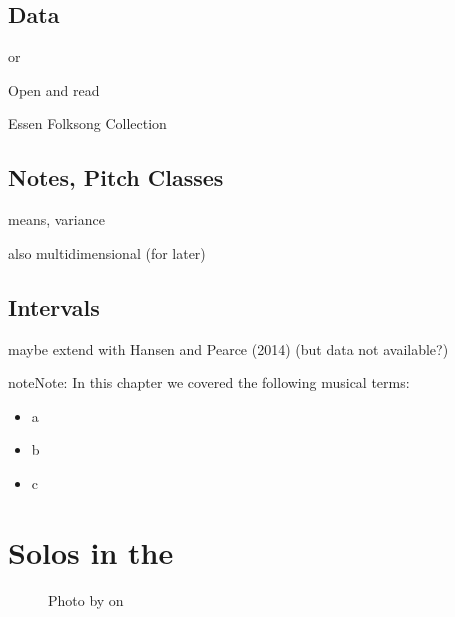 \documentclass[letterpaper,10pt,english]{sphinxmanual}
\begin{document}
\section{Data}
\label{\detokenize{3_folk_songs:data}}
or 

Open and read 

Essen Folksong Collection


\section{Notes, Pitch Classes}
\label{\detokenize{3_folk_songs:notes-pitch-classes}}

means, variance

also multidimensional (for later)


\section{Intervals}
\label{\detokenize{3_folk_songs:intervals}}

maybe extend with Hansen and Pearce (2014) (but data not available?)

\begin{sphinxadmonition}{note}{Note:}
In this chapter we covered the following musical terms:
\begin{itemize}
\item {} 
a

\item {} 
b

\item {} 
c

\end{itemize}
\end{sphinxadmonition}


\chapter{Solos in the }
\label{\detokenize{4_jazz_solos:solos-in-the-weimar-jazz-database}}\label{\detokenize{4_jazz_solos::doc}}
\begin{figure}[htbp]
\centering
\capstart

\noindent{}
\caption{Photo by 
on }\label{\detokenize{4_jazz_solos:id3}}\end{figure}
\end{document}
